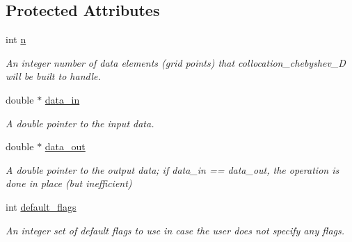 \subsection*{Protected Attributes}
\begin{DoxyCompactItemize}
\item 
\hypertarget{classexplicit__plan_a078dbf8f03ba12e9cca409dae7d34de5}{int \hyperlink{classexplicit__plan_a078dbf8f03ba12e9cca409dae7d34de5}{n}}\label{classexplicit__plan_a078dbf8f03ba12e9cca409dae7d34de5}

\begin{DoxyCompactList}\small\item\em An integer number of data elements (grid points) that collocation\-\_\-chebyshev\-\_\-D will be built to handle. \end{DoxyCompactList}\item 
\hypertarget{classexplicit__plan_a3c2d15939b99a9570088fd93e650828e}{double $\ast$ \hyperlink{classexplicit__plan_a3c2d15939b99a9570088fd93e650828e}{data\-\_\-in}}\label{classexplicit__plan_a3c2d15939b99a9570088fd93e650828e}

\begin{DoxyCompactList}\small\item\em A double pointer to the input data. \end{DoxyCompactList}\item 
\hypertarget{classexplicit__plan_a69d39b11f26cb90bda001bd76530a6ac}{double $\ast$ \hyperlink{classexplicit__plan_a69d39b11f26cb90bda001bd76530a6ac}{data\-\_\-out}}\label{classexplicit__plan_a69d39b11f26cb90bda001bd76530a6ac}

\begin{DoxyCompactList}\small\item\em A double pointer to the output data; if data\-\_\-in == data\-\_\-out, the operation is done in place (but inefficient) \end{DoxyCompactList}\item 
\hypertarget{classplan_a14f8cce3065ed97f0909eda7b62ca1dc}{int \hyperlink{classplan_a14f8cce3065ed97f0909eda7b62ca1dc}{default\-\_\-flags}}\label{classplan_a14f8cce3065ed97f0909eda7b62ca1dc}

\begin{DoxyCompactList}\small\item\em An integer set of default flags to use in case the user does not specify any flags. \end{DoxyCompactList}\end{DoxyCompactItemize}


